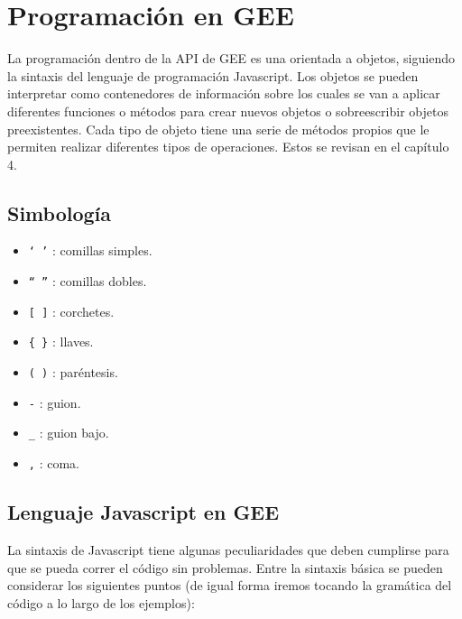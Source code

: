 \documentclass[
  12pt,
  letterpaper,
  twoside]{book}
\providecommand{\tightlist}{%
  \setlength{\itemsep}{0pt}\setlength{\parskip}{0pt}}
\begin{document}
\hypertarget{programaciuxf3n-en-gee}{%
\section{Programación en GEE}\label{programaciuxf3n-en-gee}}

La programación dentro de la API de GEE es una orientada a objetos, siguiendo la sintaxis del lenguaje de programación Javascript. Los objetos se pueden interpretar como contenedores de información sobre los cuales se van a aplicar diferentes funciones o métodos para crear nuevos objetos o sobreescribir objetos preexistentes. Cada tipo de objeto tiene una serie de métodos propios que le permiten realizar diferentes tipos de operaciones. Estos se revisan en el capítulo 4.

\hypertarget{simbologuxeda}{%
\subsection*{Simbología}\label{simbologuxeda}}

\begin{itemize}
\tightlist
\item
  \texttt{‘\ ’} : comillas simples.
\item
  \texttt{“\ ”} : comillas dobles.
\item
  \texttt{{[}\ {]}} : corchetes.
\item
  \texttt{\{\ \}} : llaves.
\item
  \texttt{(\ )} : paréntesis.
\item
  \texttt{-} : guion.
\item
  \texttt{\_} : guion bajo.
\item
  \texttt{,} : coma.
\end{itemize}

\hypertarget{lenguaje-javascript-en-gee}{%
\subsection*{Lenguaje Javascript en GEE}\label{lenguaje-javascript-en-gee}}

La sintaxis de Javascript tiene algunas peculiaridades que deben cumplirse para que se pueda correr el código sin problemas. Entre la sintaxis básica se pueden considerar los siguientes puntos (de igual forma iremos tocando la gramática del código a lo largo de los ejemplos):
\end{document}
